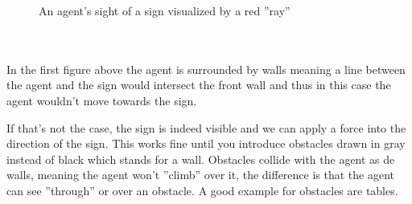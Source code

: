 \documentclass[11pt]{article}
\begin{document}
\begin{itemize}
\begin{minipage}{.3\textwidth}
\begin{figure}[H]
		An agent's sight of a sign visualized by a red ''ray''
	\end{figure}
	\end{minipage}
    \\\\
	In the first figure above the agent is surrounded by walls meaning a line between the agent and the sign would intersect the front wall and thus in this case the agent wouldn't move towards the sign.
    
    If that's not the case, the sign is indeed visible and we can apply a force into the direction of the sign. This works fine until you introduce obstacles drawn in gray instead of black which stands for a wall. Obstacles collide with the agent as de walls, meaning the agent won't ''climb'' over it, the difference is that the agent can see ''through'' or over an obstacle. A good example for obstacles are tables.
	

\end{itemize}
\end{document}
